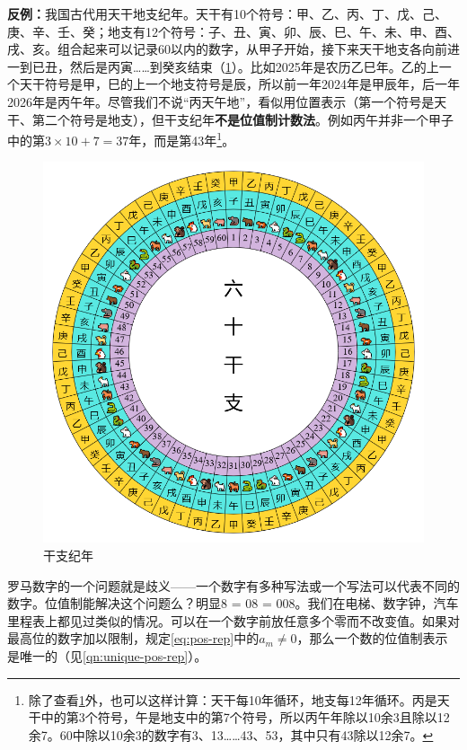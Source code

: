 \documentclass[b5paper]{ctexart}
\begin{document}
\begin{example}
\textbf{反例：}我国古代用天干地支纪年。天干有10个符号：甲、乙、丙、丁、戊、己、庚、辛、壬、癸；地支有12个符号：子、丑、寅、卯、辰、巳、午、未、申、酉、戌、亥。组合起来可以记录60以内的数字，从甲子开始，接下来天干地支各向前进一到已丑，然后是丙寅……到癸亥结束（\cref{fig:sexagenary}）。比如2025年是农历乙巳年。乙的上一个天干符号是甲，巳的上一个地支符号是辰，所以前一年2024年是甲辰年，后一年2026年是丙午年。尽管我们不说“丙天午地”，看似用位置表示（第一个符号是天干、第二个符号是地支），但干支纪年\textbf{不是位值制计数法}。例如丙午并非一个甲子中的第$3 \times 10 + 7 = 37$年，而是第43年\footnote{除了查看\cref{fig:sexagenary}外，也可以这样计算：天干每10年循环，地支每12年循环。丙是天干中的第3个符号，午是地支中的第7个符号，所以丙午年除以10余3且除以12余7。60中除以10余3的数字有3、13……43、53，其中只有43除以12余7。}。

\begin{figure}[htbp]
 \centering
 \includegraphics[scale=0.3]{img/sexagenary-chinese}
 \caption{干支纪年}
 \label{fig:sexagenary}
\end{figure}

\end{example}

罗马数字的一个问题就是歧义——一个数字有多种写法或一个写法可以代表不同的数字。位值制能解决这个问题么？明显8 = 08 = 008。我们在电梯、数字钟，汽车里程表上都见过类似的情况。可以在一个数字前放任意多个零而不改变值。如果对最高位的数字加以限制，规定\cref{eq:pos-rep}中的$a_m \neq 0$，那么一个数的位值制表示是唯一的（见\cref{qn:unique-pos-rep}）。
\end{document}
